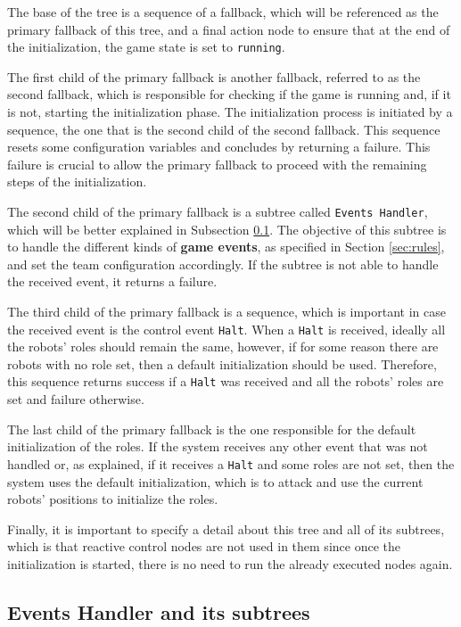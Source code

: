 The base of the tree is a sequence of a fallback, which will be referenced as the primary fallback of this tree, and a final action node to ensure that at the end of the initialization, the game state is set to \texttt{running}.

The first child of the primary fallback is another fallback, referred to as the second fallback, which is responsible for checking if the game is running and, if it is not, starting the initialization phase. The initialization process is initiated by a sequence, the one that is the second child of the second fallback. This sequence resets some configuration variables and concludes by returning a failure. This failure is crucial to allow the primary fallback to proceed with the remaining steps of the initialization.

The second child of the primary fallback is a subtree called \texttt{Events Handler}, which will be better explained in Subsection \ref{subsec:events_handler_spec}. The objective of this subtree is to handle the different kinds of \textbf{game events}, as specified in Section \ref{sec:rules}, and set the team configuration accordingly. If the subtree is not able to handle the received event, it returns a failure.

The third child of the primary fallback is a sequence, which is important in case the received event is the control event \texttt{Halt}. When a \texttt{Halt} is received, ideally all the robots' roles should remain the same, however, if for some reason there are robots with no role set, then a default initialization should be used. Therefore, this sequence returns success if a \texttt{Halt} was received and all the robots' roles are set and failure otherwise.

The last child of the primary fallback is the one responsible for the default initialization of the roles. If the system receives any other event that was not handled or, as explained, if it receives a \texttt{Halt} and some roles are not set, then the system uses the default initialization, which is to attack and use the current robots' positions to initialize the roles.

Finally, it is important to specify a detail about this tree and all of its subtrees, which is that reactive control nodes are not used in them since once the initialization is started, there is no need to run the already executed nodes again.

\subsection{Events Handler and its subtrees}
\label{subsec:events_handler_spec}

